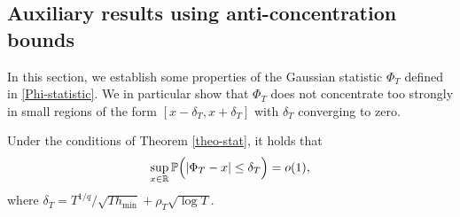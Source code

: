 \subsection*{Auxiliary results using anti-concentration bounds}


In this section, we establish some properties of the Gaussian statistic $\Phi_T$ defined in \eqref{Phi-statistic}. We in particular show that $\Phi_T$ does not concentrate too strongly in small regions of the form $[x-\delta_T,x+\delta_T]$ with $\delta_T$ converging to zero.  
%
%
\begin{propA}\label{propA-anticon}
Under the conditions of Theorem \ref{theo-stat}, it holds that 
\[ \sup_{x \in \mathbb{R}} \mathbb{P} \Big( | \Phi_T - x | \le \delta_T \Big) = o(1), \]
where $\delta_T = T^{1/q} / \sqrt{T h_{\min}} + \rho_T \sqrt{\log T}$.
\end{propA}
%
%

